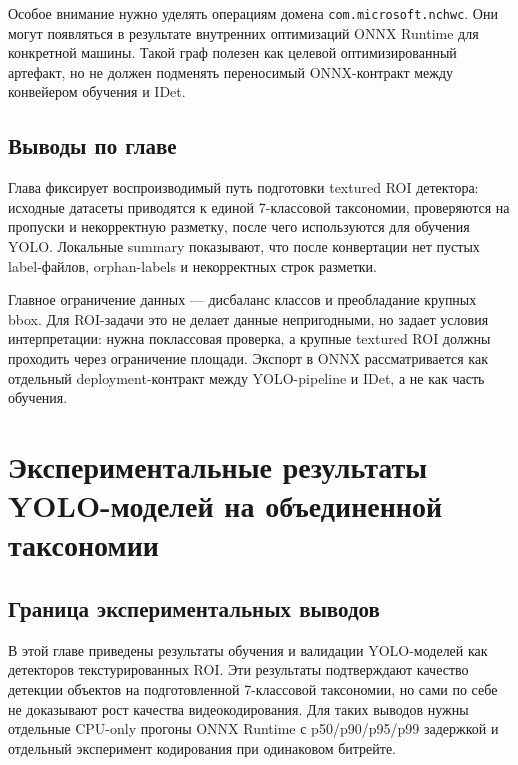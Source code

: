 \documentclass[12pt,a4paper,oneside,openany]{report}
\begin{document}
Особое внимание нужно уделять операциям домена \texttt{com.microsoft.nchwc}. Они могут
появляться в результате внутренних оптимизаций ONNX Runtime для конкретной машины. Такой граф
полезен как целевой оптимизированный артефакт, но не должен подменять переносимый ONNX-контракт
между конвейером обучения и IDet.


\section{Выводы по главе}

Глава фиксирует воспроизводимый путь подготовки textured ROI детектора: исходные датасеты
приводятся к единой 7-классовой таксономии, проверяются на пропуски и некорректную разметку,
после чего используются для обучения YOLO. Локальные summary показывают, что после конвертации
нет пустых label-файлов, orphan-labels и некорректных строк разметки.

Главное ограничение данных --- дисбаланс классов и преобладание крупных bbox. Для ROI-задачи это
не делает данные непригодными, но задает условия интерпретации: нужна поклассовая проверка, а
крупные textured ROI должны проходить через ограничение площади. Экспорт в ONNX рассматривается
как отдельный deployment-контракт между YOLO-pipeline и IDet, а не как часть обучения.


\chapter{Экспериментальные результаты YOLO-моделей на объединенной таксономии}


\section{Граница экспериментальных выводов}

В этой главе приведены результаты обучения и валидации YOLO-моделей как детекторов
текстурированных ROI. Эти результаты подтверждают качество детекции объектов на подготовленной
7-классовой таксономии, но сами по себе не доказывают рост качества видеокодирования. Для таких
выводов нужны отдельные CPU-only прогоны ONNX Runtime с p50/p90/p95/p99 задержкой и отдельный
эксперимент кодирования при одинаковом битрейте.
\end{document}
